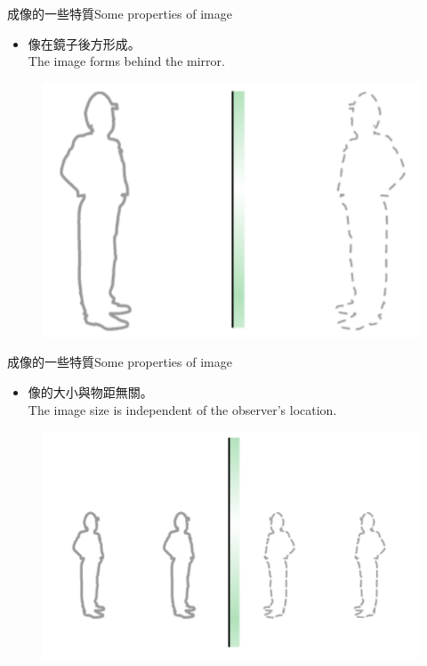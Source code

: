 \documentclass[beamer=true]{standalone}
\begin{document}
\begin{frame}{成像的一些特質Some properties of image}
    \begin{itemize}
        \item 像在鏡子後方形成。\\The image forms behind the mirror.
    \end{itemize}
\begin{figure}
    \centering
    \includegraphics[width=0.5\linewidth]{assets/dqwqoi1j2w89s.png}
\end{figure}
\end{frame}

\begin{frame}{成像的一些特質Some properties of image}
\begin{itemize}
    \item 像的大小與物距無關。\\The image size is independent of the observer's location.
\end{itemize}\bigskip
    \begin{figure}
        \centering
        \includegraphics[width=0.6\linewidth]{assets/djoijdodoi2.png}
        
        
    \end{figure}
\end{frame}
\end{document}
